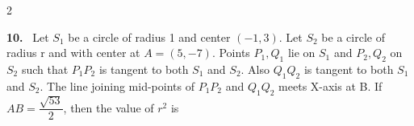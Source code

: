 \documentclass[10pt]{extarticle}
\newcommand{\qn}[1]{\par\smallskip\noindent\textbf{#1.}~}
\begin{document}
\begin{multicols}{2}
\qn{10} Let $S_1$ be a circle of radius 1 and center $(-1,3)$. Let $S_2$ be a circle of radius r and with center at $A=(5,-7)$. Points $P_1,Q_1$ lie on $S_1$ and $P_2,Q_2$ on $S_2$ such that $P_1P_2$ is tangent to both $S_1$ and $S_2$. Also $Q_1Q_2$ is tangent to both $S_1$ and $S_2$. The line joining mid-points of $P_1P_2$ and $Q_1Q_2$ meets X-axis at B. If $AB=\dfrac{\sqrt{53}}{2}$, then the value of $r^2$ is

\end{multicols}
\end{document}
